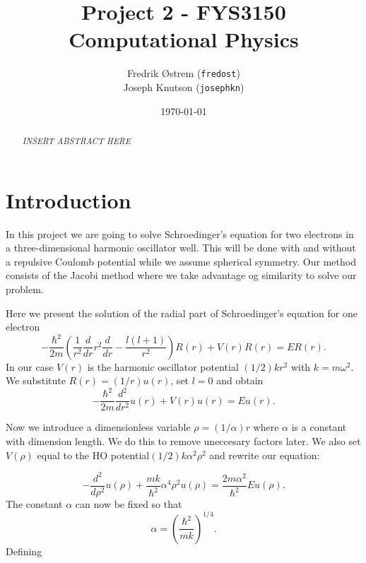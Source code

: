 \documentclass[11pt,a4paper]{article}
\begin{document}
\title{Project 2 - FYS3150 Computational Physics}
\author{Fredrik Østrem (\texttt{fredost}) \\ Joseph Knutson (\texttt{josephkn})}
\date{\today}

\maketitle

\begin{abstract}
  \color{red}\textit{INSERT ABSTRACT HERE}
\end{abstract}

\tableofcontents

\clearpage
\section{Introduction}
In this project we are going to solve Schroedinger's equation for two
electrons in a three-dimensional harmonic oscillator well. This will be done with and
without a repulsive Coulomb potential while we assume spherical symmetry. Our method consists of the Jacobi method where we take advantage og similarity to solve our problem.

Here we present the solution of the radial part of Schroedinger's equation for one electron
\begin{equation}
  -\frac{\hbar^2}{2 m} \left ( \frac{1}{r^2} \frac{d}{dr} r^2
  \frac{d}{dr} - \frac{l (l + 1)}{r^2} \right )R(r)
     + V(r) R(r) = E R(r).
\end{equation}
In our case $V(r)$ is the harmonic oscillator potential $(1/2)kr^2$ with
$k=m\omega^2$.
We substitute $R(r) = (1/r) u(r)$, set $l = 0$ and obtain
\begin{equation}
  -\frac{\hbar^2}{2 m} \frac{d^2}{dr^2} u(r)
       +  V(r)u(r)  = E u(r) .
\end{equation}

Now we introduce a dimensionless variable $\rho = (1/\alpha) r$
where $\alpha$ is a constant with dimension length. We do this to remove uneccesary factors later. We also set $V(\rho)$ equal to the HO potential$(1/2) k \alpha^2\rho^2$ and rewrite our equation:

\begin{equation}
  -\frac{d^2}{d\rho^2} u(\rho)
       + \frac{mk}{\hbar^2} \alpha^4\rho^2u(\rho)  = \frac{2m\alpha^2}{\hbar^2}E u(\rho) .
\end{equation}
The constant $\alpha$ can now be fixed
so that
\begin{equation}
\alpha = \left(\frac{\hbar^2}{mk}\right)^{1/4}.
\end{equation}
Defining
\end{document}

